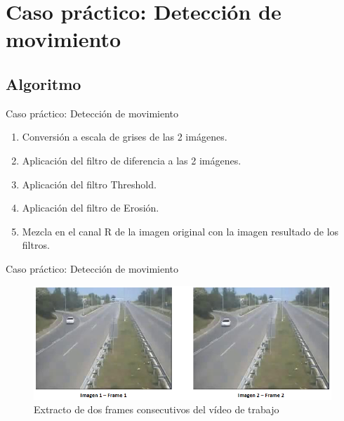 \documentclass{beamer}
\begin{document}
\section{Caso práctico: Detección de movimiento}

\subsection{Algoritmo}

\begin{frame}{Caso práctico: Detección de movimiento}
\begin{enumerate}
   \item Conversión a escala de grises de las 2 imágenes.
   \item Aplicación del filtro de diferencia a las 2 imágenes.
   \item Aplicación del filtro Threshold.
   \item Aplicación del filtro de Erosión.
   \item Mezcla en el canal R de la imagen original con la imagen resultado de los filtros.
\end{enumerate}
\end{frame}

\begin{frame}{Caso práctico: Detección de movimiento}
  \begin{figure}
    \begin{center}
      \includegraphics[width=.8\textwidth]{frames.png}
      \caption{Extracto de dos frames consecutivos del vídeo de trabajo}
    \end{center}
  \end{figure}
\end{frame}
\end{document}
